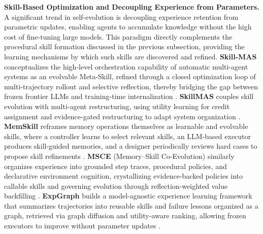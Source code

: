\documentclass[11pt]{article}
\begin{document}
\textbf{Skill-Based Optimization and Decoupling Experience from Parameters.} A significant trend in self-evolution is decoupling experience retention from parametric updates, enabling agents to accumulate knowledge without the high cost of fine-tuning large models. This paradigm directly complements the procedural skill formation discussed in the previous subsection, providing the learning mechanisms by which such skills are discovered and refined. \textbf{Skill-MAS} conceptualizes the high-level orchestration capability of automatic multi-agent systems as an evolvable Meta-Skill, refined through a closed optimization loop of multi-trajectory rollout and selective reflection, thereby bridging the gap between frozen frontier LLMs and training-time internalization \cite{ref143}. \textbf{SkillMAS} couples skill evolution with multi-agent restructuring, using utility learning for credit assignment and evidence-gated restructuring to adapt system organization \cite{ref156}. \textbf{MemSkill} reframes memory operations themselves as learnable and evolvable skills, where a controller learns to select relevant skills, an LLM-based executor produces skill-guided memories, and a designer periodically reviews hard cases to propose skill refinements \cite{ref157}. \textbf{MSCE} (Memory--Skill Co-Evolution) similarly organizes experience into grounded step traces, procedural policies, and declarative environment cognition, crystallizing evidence-backed policies into callable skills and governing evolution through reflection-weighted value backfilling \cite{ref158}. \textbf{ExpGraph} builds a model-agnostic experience learning framework that summarizes trajectories into reusable skills and failure lessons organized as a graph, retrieved via graph diffusion and utility-aware ranking, allowing frozen executors to improve without parameter updates \cite{ref159}.
\end{document}
